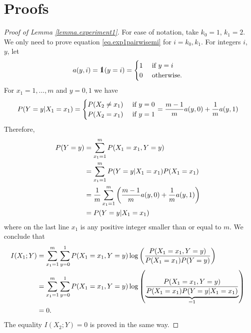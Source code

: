 \section{Proofs}
\label{sec.proofs}

\begin{proof}[Proof of Lemma \ref{lemma.experiment1}]
	For ease of notation, 
	take 
	$k_0 = 1$, 
	$k_1 = 2$. 
	We only need to prove equation \eqref{eq.exp1pairwisemi}
	for $i = k_0, k_1$. 
	For integers $i$, $y$, 
	let 
	\begin{equation*}
		a(y, i) = \one(y = i) 
		= 
		\begin{cases}
			1 & \text{ if } y = i
			\\
			0 & \text{ otherwise}.
		\end{cases}
	\end{equation*}
	For 
	$x_1 = 1, \dots, m$
	and
	$y = 0, 1$
	we have
	\begin{equation*}
		{{P}}(Y = y \vert X_1 = x_1)
		=
		\begin{cases}
			{{P}}(X_2 \neq x_1) & \text { if } y = 0
			\\
			{{P}}(X_2 = x_1) & \text { if } y = 1
		\end{cases}
		=
		\frac{m-1}{m} a(y, 0)
		+
		\frac{1}{m} a(y, 1)
	\end{equation*}
	Therefore,
	\begin{equation*}
		\begin{split}
			{{P}}(Y = y) 
			& =
			\sum_{x_1 = 1}^{m}
			{{P}}(X_1 = x_1, Y = y)
			\\
			& = 
			\sum_{x_1 = 1}^{m}
			{{P}}(Y = y \vert X_1 = x_1)
			{{P}}(X_1 = x_1)
			\\
			& = 
			\frac{1}{m}
			\sum_{x_1 = 1}^{m}
			\left(
			\frac{m-1}{m} a(y, 0)
			+
			\frac{1}{m} a(y, 1)
			\right)
			\\
			& = 
			{{P}}(Y = y \vert X_1 = x_1)
		\end{split}
	\end{equation*}
	where on the last line $x_1$ is any positive integer smaller than or equal to $m$. 
	We conclude that
	\begin{equation*}
		\begin{split}
		I(X_1; Y)
		& = 
		\sum_{x_1 = 1}^{m}
		\sum_{y=0}^{1}
		{{P}}(X_1 = x_1, Y = y)
		\log
		\left(
		\frac{
		{{P}}(X_1 = x_1, Y = y)
		}
		{
			{{P}}(X_1 = x_1){{P}}(Y=y)
		}
		\right)
		\\
		& = 
		\sum_{x_1 = 1}^{m}
		\sum_{y=0}^{1}
		{{P}}(X_1 = x_1, Y = y)
		\log
		\left(
		\underbrace{
		\frac{
		{{P}}(X_1 = x_1, Y = y)
		}
		{
			{{P}}(X_1 = x_1)
			{{P}}(Y = y \vert X_1 = x_1)
		}
		}_{ = 1}
		\right)
		\\
		& = 
		0.
		\end{split}
	\end{equation*}
	The equality $I(X_2; Y) = 0$ is proved in the same way. 


\end{proof}
